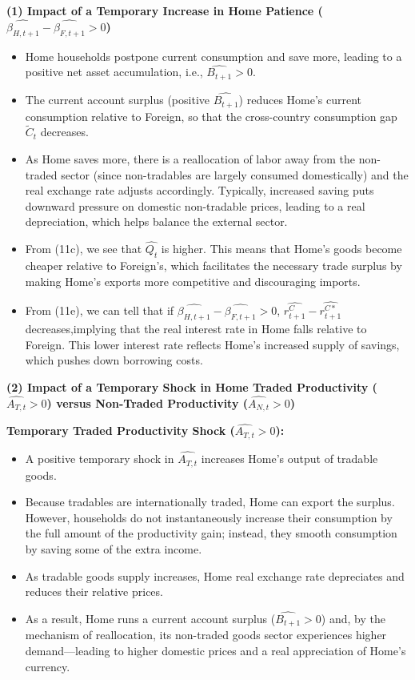 \documentclass[a4paper,12pt]{article} %
\theoremstyle{nonitalic}
\begin{document}
\textbf{(1) Impact of a Temporary Increase in Home Patience (\( \widehat{\beta_{H,t+1}} - \widehat{\beta_{F,t+1}} > 0 \))}
\begin{itemize}
    \item Home households postpone current consumption and save more, leading to a positive net asset accumulation, i.e., \( \widehat{B_{t+1}} > 0 \).
    \item The current account surplus (positive \( \widehat{B_{t+1}} \)) reduces Home's current consumption relative to Foreign, so that the cross-country consumption gap \( \widetilde{C}_t \) decreases.
    \item As Home saves more, there is a reallocation of labor away from the non-traded sector (since non-tradables are largely consumed domestically) and the real exchange rate adjusts accordingly. Typically, increased saving puts downward pressure on domestic non-tradable prices, leading to a real depreciation, which helps balance the external sector.
    \item From (11c), we see that $\widehat{Q_t}$ is higher. This means that Home’s goods become cheaper relative to Foreign’s, which facilitates the necessary trade surplus by making Home’s exports more competitive and discouraging imports.
    \item From (11e), we can tell that if $\widehat{\beta_{H,t+1}} - \widehat{\beta_{F,t+1}} > 0$, $\widehat{r_{t+1}^C} - \widehat{r_{t+1}^{C*}}$ decreases,implying that the real interest rate in Home falls relative to Foreign. This lower interest rate reflects Home’s increased supply of savings, which pushes down borrowing costs.
\end{itemize}

\textbf{(2) Impact of a Temporary Shock in Home Traded Productivity (\( \widehat{A_{T,t}} > 0 \)) versus Non-Traded Productivity (\( \widehat{A_{N,t}} > 0 \))}

\textbf{Temporary Traded Productivity Shock (\( \widehat{A_{T,t}} > 0 \)):}
\begin{itemize}
    \item A positive temporary shock in \( \widehat{A_{T,t}} \) increases Home's output of tradable goods.
    \item Because tradables are internationally traded, Home can export the surplus. However, households do not instantaneously increase their consumption by the full amount of the productivity gain; instead, they smooth consumption by saving some of the extra income.
    \item As tradable goods supply increases, Home real exchange rate depreciates and reduces their relative prices.
    \item As a result, Home runs a current account surplus (\( \widehat{B_{t+1}} > 0 \)) and, by the mechanism of reallocation, its non-traded goods sector experiences higher demand—leading to higher domestic prices and a real appreciation of Home's currency.
\end{itemize}
\end{document}
